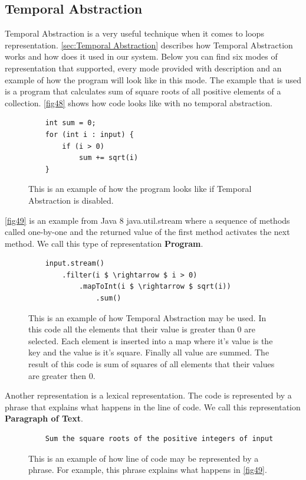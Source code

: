 \subsection{Temporal Abstraction}
Temporal Abstraction is a very useful technique when it comes to loops representation. \autoref{sec:Temporal Abstraction} describes how Temporal Abstraction works and how does it used in our system. Below you can find six modes of representation that supported, every mode provided with description and an example of how the program will look like in this mode. The example that is used is a program that calculates sum of square roots of all positive elements of a collection.
\autoref{fig48} shows how code looks like with no temporal abstraction.
\begin{figure}[H]
	\begin{lstlisting}
	int sum = 0;
	for (int i : input) {
		if (i > 0)
			sum += sqrt(i)
	}
	\end{lstlisting}
	\caption{This is an example of how the program looks like if Temporal Abstraction is disabled.}
	\label{fig48}
\end{figure}
\autoref{fig49} is an example from Java 8 java.util.stream where a sequence of methods called one-by-one and the returned value of the first method activates the next method. We call this type of representation \textbf{Program}.
\begin{figure}[H]
	\begin{lstlisting}
	input.stream()
		.filter(i $ \rightarrow $ i > 0)
			.mapToInt(i $ \rightarrow $ sqrt(i))
				.sum()
	\end{lstlisting}
	\caption{This is an example of how Temporal Abstraction may be used. In this code all the elements that their value is greater than 0 are selected. Each element is inserted into a map where it's value is the key and the value is it's square. Finally all value are summed. The result of this code is sum of squares of all elements that their values are greater then 0.}
	\label{fig49}
\end{figure}
Another representation is a lexical representation. The code is represented by a phrase that explains what happens in the line of code. We call this representation \textbf{Paragraph of Text}.
\begin{figure}[H]
	\begin{lstlisting}
	Sum the square roots of the positive integers of input
	\end{lstlisting}
	\caption{This is an example of how line of code may be represented by a phrase. For example, this phrase explains what happens in \autoref{fig49}.}
	\label{fig50}
\end{figure}
